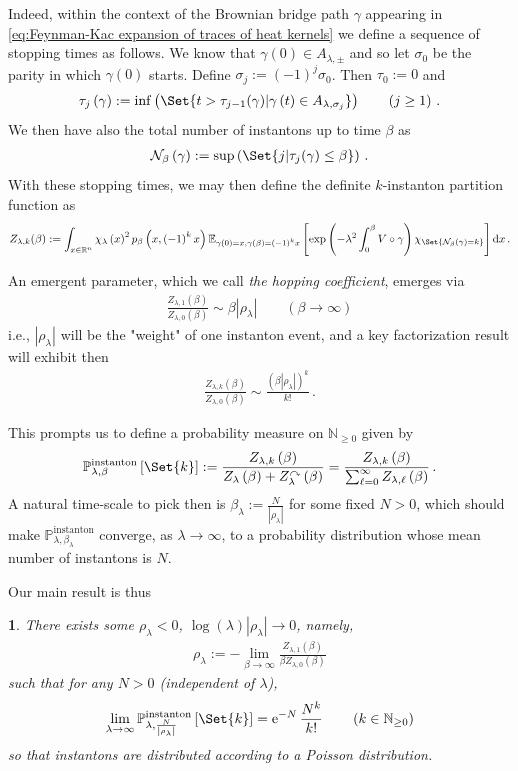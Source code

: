 \documentclass[a4paper,10pt]{article}
\numberwithin{equation}{section}
\theoremstyle{plain}
\newtheorem{thm}{\protect\theoremname}[section]
\theoremstyle{plain}
\theoremstyle{plain}
\theoremstyle{plain}
\theoremstyle{plain}
\theoremstyle{remark}
\theoremstyle{definition}
\providecommand{\theoremname}{Theorem}
\newcommand{\ee}{\operatorname{e}}
\newcommand{\NN}{\mathbb{N}}
\newcommand{\dif}{\operatorname{d}\!} %
\newcommand{\abs}[1]{\left\lvert#1\right\rvert}
\newcommand{\eq}[1]{\begin{align*}#1\end{align*}}
\newcommand{\eql}[1]{\begin{align}#1\end{align}}
\newcommand{\br}[1]{\left(#1\right)}
\begin{document}
Indeed, within the context of the Brownian bridge path $\gamma$ appearing in \cref{eq:Feynman-Kac expansion of traces of heat kernels} we define a sequence of stopping times as follows. We know that $\gamma(0)\in A_{\lambda,\pm}$ and so let $\sigma_0$ be the parity in which $\gamma(0)$ starts. Define $\sigma_j:=(-1)^j\sigma_0$. Then $\tau_0:=0$ and
\eql{\tau_{j}\left(\gamma\right)	:=	\inf\left(\Set{t>\tau_{j-1}(\gamma)|\gamma\left(t\right)\in A_{\lambda,\sigma_{j}}}\right)\qquad\left(j\geq1\right)\,.} We then have also the total number of instantons up to time $\beta$ as 
\eql{
\mathcal{N}_{\beta}\left(\gamma\right)	:=	\sup\left(\Set{j|\tau_{j}(\gamma)\leq \beta}\right)\,.
} With these stopping times, we may then define the definite $k$-instanton partition function as 
\eql{
Z_{\lambda,k}(\beta) := \int_{x\in\mathbb{R}^{n}}\chi_{\lambda}\left(x\right)^{2}p_{\beta}\left(x,\left(-1\right)^{k}x\right)\mathbb{E}_{\gamma\left(0\right)=x,\gamma\left(\beta\right)=\left(-1\right)^{k}x}\left[\exp\left(-\lambda^{2}\int_{0}^{\beta}V\circ\gamma\right)\chi_{\Set{\mathcal{N}_{\beta}\left(\gamma\right)=k}}\right]\dif{x}\,.
}

An emergent parameter, which we call \emph{the hopping coefficient}, emerges via
\eq{
\frac{Z_{\lambda,1}(\beta)}{ Z_{\lambda,0}(\beta)} \sim \beta\abs{\rho_\lambda}\qquad(\beta\to\infty)
} i.e., $\abs{\rho_\lambda}$ will be the "weight" of one instanton event, and a key factorization result will exhibit then
\eq{
\frac{Z_{\lambda,k}(\beta)}{ Z_{\lambda,0}(\beta)} \sim \frac{\br{\beta\abs{\rho_\lambda}}^k}{k!}\,.
} 

This prompts us to define a probability measure on $\NN_{\geq0}$ given by
\eql{
\mathbb{P}_{\lambda,\beta}^{\text{instanton}}\left[\Set{k}\right] := \frac{Z_{\lambda,k}\left(\beta\right)}{Z_{\lambda}\left(\beta\right)+Z_{\lambda}^\curvearrowright \left(\beta\right)} = \frac{Z_{\lambda,k}\left(\beta\right)}{\sum_{\ell=0}^\infty Z_{\lambda,\ell}\left(\beta\right)}\,.
} A natural time-scale to pick then is $\beta_\lambda := \frac{N}{\abs{\rho_\lambda}}$ for some fixed $N>0$, which should make $\mathbb{P}_{\lambda,\beta_\lambda}^{\text{instanton}}$ converge, as $\lambda\to\infty$, to a probability distribution whose mean number of instantons is $N$.

Our main result is thus
\begin{thm}\label{thm:Poisson distribution}
    There exists some $\rho_{\lambda}<0$, $\log(\lambda)\abs{\rho_\lambda}\to0$, namely,
    \eql{\label{eq:hopping coefficient in terms of partition functions}
    \rho_\lambda := -\lim_{\beta\to\infty}\frac{Z_{\lambda,1}(\beta)}{\beta Z_{\lambda,0}(\beta)}
    }
    such that for any $N>0$ (independent of $\lambda$), \eql{\lim_{\lambda\to\infty}\mathbb{P}_{\lambda,\frac{N}{\abs{\rho_{\lambda}}}}^{\text{instanton}}\left[\Set{k}\right]	=	\ee^{-N}\frac{N^{k}}{k!}\qquad\left(k\in\mathbb{N}_{\geq0}\right)} so that instantons are distributed according to a Poisson distribution.
\end{thm}
\end{document}
